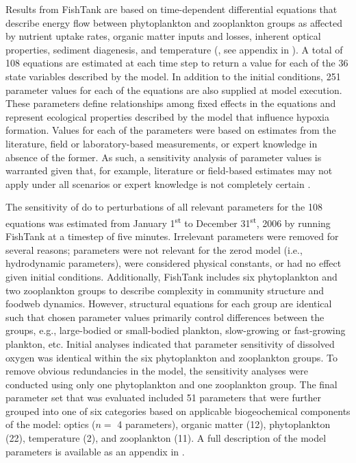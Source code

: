 \documentclass[letterpaper,12pt,oneside]{article}\usepackage[]{graphicx}\usepackage[]{color}
\begin{document}
Results from FishTank are based on time-dependent differential equations that describe energy flow between phytoplankton and zooplankton groups as affected by nutrient uptake rates, organic matter inputs and losses, inherent optical properties, sediment diagenesis, and temperature (\citealt{Penta08,Eldridge10}, see appendix in ).  A total of 108 equations are estimated at each time step to return a value for each of the 36 state variables described by the model.  In addition to the initial conditions, 251 parameter values for each of the equations are also supplied at model execution.  These parameters define relationships among fixed effects in the equations and represent ecological properties described by the model that influence hypoxia formation.  Values for each of the parameters were based on estimates from the literature, field or laboratory-based measurements, or expert knowledge in absence of the former.  As such, a sensitivity analysis of parameter values is warranted given that, for example, literature or field-based estimates may not apply under all scenarios or expert knowledge is not completely certain \citep{Refsgaard07}.



The sensitivity of \ac{do} to perturbations of all relevant parameters for the 108 equations was estimated from January 1\textsuperscript{st} to December 31\textsuperscript{st}, 2006 by running FishTank at a timestep of five minutes. Irrelevant parameters were removed for several reasons; parameters were not relevant for the \ac{zerod} model (i.e., hydrodynamic parameters), were considered physical constants, or had no effect given initial conditions.  Additionally, FishTank includes six phytoplankton and two zooplankton groups to describe complexity in community structure and foodweb dynamics.  However, structural equations for each group are identical such that chosen parameter values primarily control differences between the groups, e.g., large-bodied or small-bodied plankton, slow-growing or fast-growing plankton, etc.  Initial analyses indicated that parameter sensitivity of dissolved oxygen was identical within the six phytoplankton and zooplankton groups.  To remove obvious redundancies in the model, the sensitivity analyses were conducted using only one phytoplankton and one zooplankton group.  The final parameter set that was evaluated included 51 parameters that were further grouped into one of six categories based on applicable biogeochemical components of the model: optics ($n = $ 4 parameters), organic matter (12), phytoplankton (22), temperature (2), and zooplankton (11).  A full description of the model parameters is available as an appendix in .  
\end{document}
